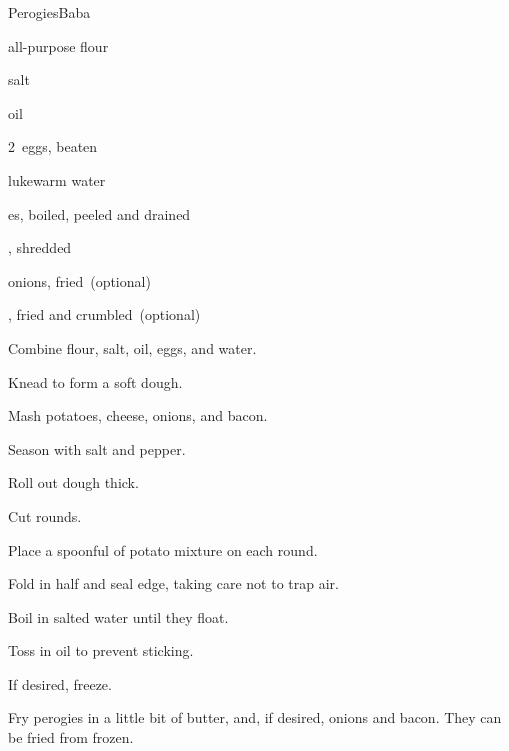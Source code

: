 \begin{recipe}{Perogies}{Baba}{}

\begin{ingredients}
\item {} all-purpose flour
\item \tp{1\half} salt
\item {} oil
\item 2~eggs, beaten
\item \C{1\half} lukewarm water
\item \lbs{2\half} es, boiled, peeled and drained
\item \lbs{\half} , shredded
\item onions, fried~(optional)
\item {}, fried and crumbled~(optional)
\end{ingredients}

\begin{directions}
\item Combine flour, salt, oil, eggs, and water.
\item Knead to form a soft dough.
\item Mash potatoes, cheese, onions, and bacon.
\item Season with salt and pepper.
\item Roll out dough \inch{\eighth} thick.
\item Cut  rounds.
\item Place a spoonful of potato mixture on each round.
\item Fold in half and seal edge, taking care not to trap air.
\item Boil in salted water until they float.
\item Toss in oil to prevent sticking.
\item If desired, freeze.
\item Fry perogies in a little bit of butter, and, if desired, onions and bacon. They can be fried from frozen.
\end{directions}

\end{recipe}
